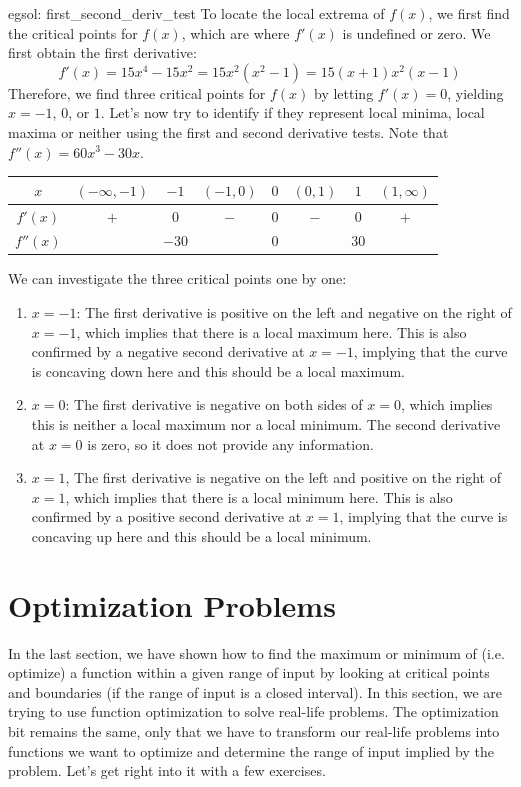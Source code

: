 \begin{egsol}[]{egsol: first_second_deriv_test}
    To locate the local extrema of $f(x)$, we first find the critical points for $f(x)$, which are where $f'(x)$ is undefined or zero.  We first obtain the first derivative:
    \[f'(x) = 15x^4-15x^2 = 15x^2(x^2-1) = 15(x+1)x^2(x-1)\]
    Therefore, we find three critical points for $f(x)$ by letting $f'(x) = 0$, yielding $x= -1$, $0$, or $1$.  Let's now try to identify if they represent local minima, local maxima or neither using the first and second derivative tests.  Note that $f''(x) = 60x^3-30x$.
    \begin{center}
        \begin{tabular}{c|ccccccc}
            $x$ & $(-\infty, -1)$ & $-1$ & $(-1, 0)$ & $0$ & $(0,1)$ & $1$ & $(1, \infty)$  \\
            \hline
            $f'(x)$ & $+$ & $0$ & $-$ & $0$ & $-$ & $0$ & $+$\\
            $f''(x)$ && $-30$ && $0$ && $30$ &
        \end{tabular}
    \end{center}
    We can investigate the three critical points one by one:
    \begin{enumerate}
        \item $x = -1$: The first derivative is positive on the left and negative on the right of $x=-1$, which implies that there is a local maximum here.  This is also confirmed by a negative second derivative at $x = -1$, implying that the curve is concaving down here and this should be a local maximum.
        \item $x = 0$: The first derivative is negative on both sides of $x=0$, which implies this is neither a local maximum nor a local minimum.  The second derivative at $x = 0$ is zero, so it does not provide any information.
        \item $x = 1$, The first derivative is negative on the left and positive on the right of $x=1$, which implies that there is a local minimum here.  This is also confirmed by a positive second derivative at $x = 1$, implying that the curve is concaving up here and this should be a local minimum.
    \end{enumerate}
\end{egsol}

\pagebreak
\section{Optimization Problems}
In the last section, we have shown how to find the maximum or minimum of (i.e. optimize) a function within a given range of input by looking at critical points and boundaries (if the range of input is a closed interval).  In this section, we are trying to use function optimization to solve real-life problems.  The optimization bit remains the same, only that we have to transform our real-life problems into functions we want to optimize and determine the range of input implied by the problem.  Let's get right into it with a few exercises.


